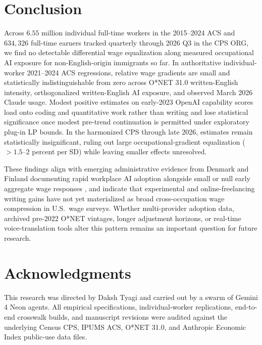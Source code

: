 \documentclass[11pt]{amsart}
\begin{document}
\FloatBarrier
\section{Conclusion}

Across $6.55$ million individual full-time workers in the 2015--2024 ACS and $634{,}326$ full-time earners tracked quarterly through 2026 Q3 in the CPS ORG, we find no detectable differential wage equalization along measured occupational AI exposure for non-English-origin immigrants so far. In authoritative individual-worker 2021--2024 ACS regressions, relative wage gradients are small and statistically indistinguishable from zero across O*NET 31.0 written-English intensity, orthogonalized written-English AI exposure, and observed March 2026 Claude usage. Modest positive estimates on early-2023 OpenAI capability scores load onto coding and quantitative work rather than writing and lose statistical significance once modest pre-trend continuation is permitted under exploratory plug-in LP bounds. In the harmonized CPS through late 2026, estimates remain statistically insignificant, ruling out large occupational-gradient equalization ($>1.5\text{--}2$ percent per SD) while leaving smaller effects unresolved.

These findings align with emerging administrative evidence from Denmark and Finland documenting rapid workplace AI adoption alongside small or null early aggregate wage responses \citep{HumlumVestergaard2025, KauhanenRouvinen2025}, and indicate that experimental and online-freelancing writing gains \citep{NoyZhang2023, Dalaman2025, CaoLi2025SSRN} have not yet materialized as broad cross-occupation wage compression in U.S.\ wage surveys. Whether multi-provider adoption data, archived pre-2022 O*NET vintages, longer adjustment horizons, or real-time voice-translation tools alter this pattern remains an important question for future research.

\section*{Acknowledgments}
This research was directed by Daksh Tyagi and carried out by a swarm of Gemini 4 Neon agents. All empirical specifications, individual-worker replications, end-to-end crosswalk builds, and manuscript revisions were audited against the underlying Census CPS, IPUMS ACS, O*NET 31.0, and Anthropic Economic Index public-use data files.
\end{document}
